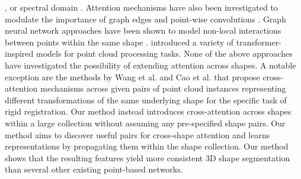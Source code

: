 \documentclass{egpubl}
\begin{document}
\cite{wang2018dynamic,shen2018mining,Davis18,wang2018local,zhang_linked_2019,Liu2019,Landrieu2019point,li2021deepgcns_pami,jiang2019hierarchical,xu2019gridgcn,Wang2019gcn,han2019point2node,Le:deeper:2019,SGPMarios},
or spectral domain \cite{Yi2017:syncspec,Boscaini2015spectral,Boscaini2016,Monti2017}.
Attention mechanisms have also been investigated to modulate the importance  of  graph edges and point-wise convolutions  \cite{Xie18,xu2019gridgcn,Wang2019gcn,shi2019pairwiseattention}. Graph neural network approaches have  been shown to model non-local interactions between points within the same shape \cite{wang2018dynamic,li2021deepgcns_pami,xu2019gridgcn,han2019point2node}. 
introduced a variety of transformer-inspired models for point cloud processing tasks. 
None of the above approaches have investigated the possibility of extending
attention across shapes. A notable exception are the methods by Wang et al. \cite{Wang_2019_ICCV} and Cao et al.  \cite{Cao_2021_ICCV} that propose cross-attention mechanisms across given pairs of point cloud instances representing different transformations of the same underlying shape for the specific task of rigid registration. 
Our method instead introduces cross-attention across shapes within a large collection without assuming any pre-specified shape pairs. Our method aims to discover useful pairs for cross-shape attention and learns representations by propagating them within the shape collection. Our method shows that the resulting features yield more consistent 3D shape segmentation than several other existing point-based networks. 

\vspace*{-4mm}
\end{document}

